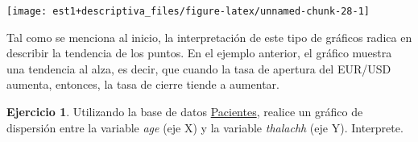\documentclass[
  11pt,
]{book}
\theoremstyle{definition}
\theoremstyle{definition}
\theoremstyle{definition}
\newtheorem{exercise}{Ejercicio}[chapter]
\theoremstyle{definition}
\theoremstyle{remark}
\begin{document}
\begin{center}\texttt{[image: est1+descriptiva\_files/figure-latex/unnamed-chunk-28-1]} \end{center}

Tal como se menciona al inicio, la interpretación de este tipo de gráficos radica en describir la tendencia de los puntos. En el ejemplo anterior, el gráfico muestra una tendencia al alza, es decir, que cuando la tasa de apertura del EUR/USD aumenta, entonces, la tasa de cierre tiende a aumentar.

\begin{exercise}
Utilizando la base de datos \hyperref[Pacientes]{Pacientes}, realice un gráfico de dispersión entre la variable \emph{age} (eje X) y la variable \emph{thalachh} (eje Y). Interprete.
\end{exercise}
\end{document}

